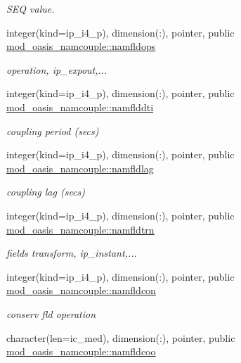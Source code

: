 \begin{DoxyCompactItemize}
\begin{DoxyCompactList}\small\item\em S\+EQ value. \end{DoxyCompactList}\item 
integer(kind=ip\+\_\+i4\+\_\+p), dimension(\+:), pointer, public \hyperlink{namespacemod__oasis__namcouple_a4841e350d91926f5f8403e73442c76ad}{mod\+\_\+oasis\+\_\+namcouple\+::namfldops}
\begin{DoxyCompactList}\small\item\em operation, ip\+\_\+expout,... \end{DoxyCompactList}\item 
integer(kind=ip\+\_\+i4\+\_\+p), dimension(\+:), pointer, public \hyperlink{namespacemod__oasis__namcouple_a9080617143dacb027f74c4c5158b5e58}{mod\+\_\+oasis\+\_\+namcouple\+::namflddti}
\begin{DoxyCompactList}\small\item\em coupling period (secs) \end{DoxyCompactList}\item 
integer(kind=ip\+\_\+i4\+\_\+p), dimension(\+:), pointer, public \hyperlink{namespacemod__oasis__namcouple_a6a4406ca14f91ef6514a18eb154e648f}{mod\+\_\+oasis\+\_\+namcouple\+::namfldlag}
\begin{DoxyCompactList}\small\item\em coupling lag (secs) \end{DoxyCompactList}\item 
integer(kind=ip\+\_\+i4\+\_\+p), dimension(\+:), pointer, public \hyperlink{namespacemod__oasis__namcouple_a5f81bc00e6dc045770edd4093f68278c}{mod\+\_\+oasis\+\_\+namcouple\+::namfldtrn}
\begin{DoxyCompactList}\small\item\em fields transform, ip\+\_\+instant,... \end{DoxyCompactList}\item 
integer(kind=ip\+\_\+i4\+\_\+p), dimension(\+:), pointer, public \hyperlink{namespacemod__oasis__namcouple_a96aa6a31ef021468f807819a84b327c3}{mod\+\_\+oasis\+\_\+namcouple\+::namfldcon}
\begin{DoxyCompactList}\small\item\em conserv fld operation \end{DoxyCompactList}\item 
character(len=ic\+\_\+med), dimension(\+:), pointer, public \hyperlink{namespacemod__oasis__namcouple_a119b86702766d5392cb44856448bcd3e}{mod\+\_\+oasis\+\_\+namcouple\+::namfldcoo}

\end{DoxyCompactItemize}
